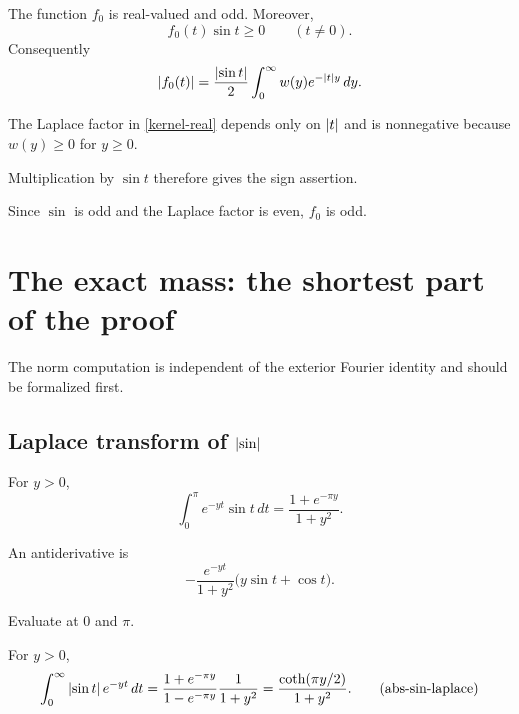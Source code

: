 \begin{lemma}
The function $f_0$ is real-valued and odd. Moreover,
\[
  f_0(t)\sin t\ge0
  \qquad(t\ne0).
\]
Consequently
\[
  \left\lvert f_0(t)\right\rvert
  =\frac{\left\lvert \sin t\right\rvert}2
     \int_0^\infty w(y)e^{-\left\lvert t\right\rvert y}\,dy.
\]
\end{lemma}

\begin{proofoutline}
\item The Laplace factor in \eqref{kernel-real} depends only on $\left\lvert t\right\rvert$ and is nonnegative because $w(y)\ge0$ for $y\ge0$.
\item Multiplication by $\sin t$ therefore gives the sign assertion.
\item Since $\sin$ is odd and the Laplace factor is even, $f_0$ is odd.
\end{proofoutline}

\section{The exact mass: the shortest part of the proof}

The norm computation is independent of the exterior Fourier identity and should be formalized first.

\subsection{Laplace transform of $\left\lvert \sin\right\rvert$}

\begin{lemma}
For $y>0$,
\begin{equation}
  \int_0^\pi e^{-yt}\sin t\,dt
  =\frac{1+e^{-\pi y}}{1+y^2}.
  \tag{sin-period}\label{sin-period}
\end{equation}
\end{lemma}

\begin{proofoutline}
\item An antiderivative is
\[
  -\frac{e^{-yt}}{1+y^2}\bigl(y\sin t+\cos t\bigr).
\]
\item Evaluate at $0$ and $\pi$.
\end{proofoutline}

\begin{lemma}
For $y>0$,
\begin{equation}
  \int_0^\infty \left\lvert \sin t\right\rvert e^{-yt}\,dt
  =\frac{1+e^{-\pi y}}{1-e^{-\pi y}}\frac1{1+y^2}
  =\frac{\operatorname{coth}(\pi y/2)}{1+y^2}.
  \tag{abs-sin-laplace}\label{abs-sin-laplace}
\end{equation}
\end{lemma}

